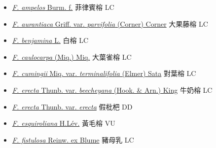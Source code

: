 \begin{itemize}
  \begin{itemize}
        \item[] \href{http://www.theplantlist.org/tpl1.1/search?q=Ficus+ampelos}{\textit{F. ampelos} Burm. f.}     菲律賓榕 LC
        \item[] \href{http://www.theplantlist.org/tpl1.1/search?q=Ficus+aurantiaca+var.+parvifolia}{\textit{F. aurantiaca} Griff. var. \textit{parvifolia} (Corner) Corner}   大果藤榕 LC
        \item[] \href{http://www.theplantlist.org/tpl1.1/search?q=Ficus+benjamina}{\textit{F. benjamina} L.}   白榕 LC
        \item[] \href{http://www.theplantlist.org/tpl1.1/search?q=Ficus+caulocarpa}{\textit{F. caulocarpa} (Miq.) Miq.}   大葉雀榕 LC
        \item[] \href{http://www.theplantlist.org/tpl1.1/search?q=Ficus+cumingii+var.+terminalifolia}{\textit{F. cumingii} Miq. var. \textit{terminalifolia} (Elmer) Sata}   對葉榕 LC
        \item[] \href{http://www.theplantlist.org/tpl1.1/search?q=Ficus+erecta+var.+beecheyana}{\textit{F. erecta} Thunb. var. \textit{beecheyana} (Hook. \& Arn.) King}   牛奶榕 LC
        \item[] \href{http://www.theplantlist.org/tpl1.1/search?q=Ficus+erecta+var.+erecta}{\textit{F. erecta} Thunb. var. \textit{erecta}}   假枇杷 DD
        \item[] \href{http://www.theplantlist.org/tpl1.1/search?q=Ficus+esquiroliana}{\textit{F. esquiroliana} H.Lév.}   黃毛榕 VU
        \item[] \href{http://www.theplantlist.org/tpl1.1/search?q=Ficus+fistulosa}{\textit{F. fistulosa} Reinw. ex Blume}   豬母乳 LC

\end{itemize}
\end{itemize}
